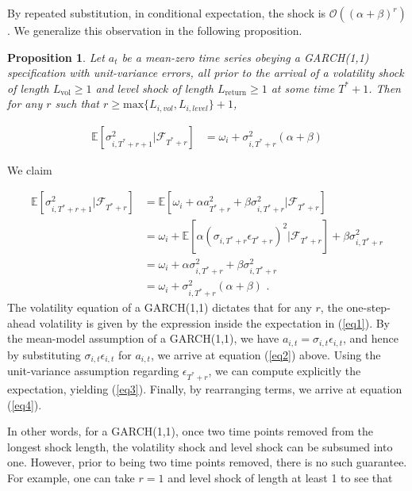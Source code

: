 \documentclass[11pt,3p,review,authoryear]{elsarticle}
\newtheorem{prop}{Proposition}
\theoremstyle{definition}
\newenvironment{proof-of-proposition}[1][{}]{\noindent{\bf
    Proof of Proposition {#1}}
  \hspace*{.5em}}{\qed\bigskip\\}
\begin{document}
By repeated substitution, in conditional expectation, the shock is $\mathcal{O}((\alpha+\beta)^{r})$.  We generalize this observation in the following proposition.

\begin{prop}
Let $a_{t}$ be a mean-zero time series obeying a GARCH(1,1) specification with unit-variance errors, all prior to the arrival of a volatility shock of length $L_{\text{vol}} \geq 1$ and level shock of length $L_{\text{return}}\geq 1$ at some time $T^{*}+1$.  Then for any $r$ such that $r \geq \text{max}\{L_{i, vol},L_{i, level}\} + 1$, 

\begin{align*}
\mathbb{E}[ \sigma^{2}_{i,T^{*}+r+1} |\mathcal{F}_{T^{*}+r}] & = \omega_{i} + \sigma^{2}_{i,T^{*}+r}(\alpha + \beta)
\end{align*}
\end{prop}

\begin{proof-of-proposition}
We claim

\begin{align}
\mathbb{E}[ \sigma^{2}_{i,T^{*}+r+1} |\mathcal{F}_{T^{*}+r}] & = \mathbb{E}[\omega_{i} + \alpha a_{T^{*}+r}^{2} + \beta\sigma^{2}_{i,T^{*}+r} |\mathcal{F}_{T^{*}+r}] \label{eq1}\\
& = \omega_{i} + \mathbb{E}[\alpha(\sigma_{i,T^{*}+r}\epsilon_{T^{*}+r})^{2} |\mathcal{F}_{T^{*}+r}] + \beta\sigma^{2}_{i,T^{*}+r} \label{eq2}\\
& = \omega_{i} + \alpha\sigma_{i,T^{*}+r}^{2} + \beta\sigma^{2}_{i,T^{*}+r} \label{eq3}\\
& = \omega_{i} + \sigma^{2}_{i,T^{*}+r}(\alpha + \beta) \label{eq4} \text{ .}
\end{align}
The volatility equation of a GARCH(1,1) dictates that for any $r$, the one-step-ahead volatility is given by the expression inside the expectation in (\ref{eq1}).  By the mean-model assumption of a GARCH(1,1), we have $a_{i,t} = \sigma_{i,t}\epsilon_{i,t}$, and hence by substituting $\sigma_{i,t}\epsilon_{i,t}$ for $a_{i,t}$, we arrive at equation (\ref{eq2}) above.  Using the unit-variance assumption regarding $\epsilon_{T^{*}+r}$, we can compute explicitly the expectation, yielding (\ref{eq3}).  Finally, by rearranging terms, we arrive at equation (\ref{eq4}).
\end{proof-of-proposition}
In other words, for a GARCH(1,1), once two time points removed from the longest shock length, the volatility shock and level shock can be subsumed into one.  However, prior to being two time points removed, there is no such guarantee.  For example, one can take $r = 1$ and level shock of length at least 1 to see that 
\end{document}
